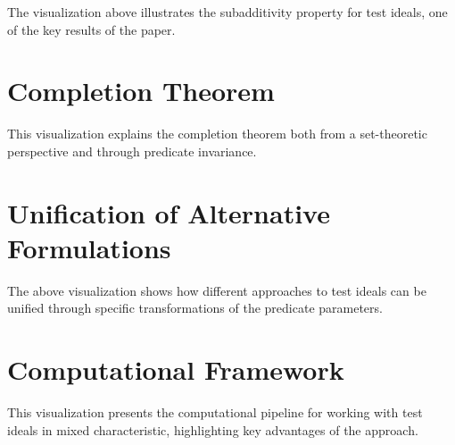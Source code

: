 \documentclass{article}
\begin{document}
The visualization above illustrates the subadditivity property for test ideals, one of the key results of the paper.

\section{Completion Theorem}


This visualization explains the completion theorem both from a set-theoretic perspective and through predicate invariance.

\section{Unification of Alternative Formulations}


The above visualization shows how different approaches to test ideals can be unified through specific transformations of the predicate parameters.

\section{Computational Framework}


This visualization presents the computational pipeline for working with test ideals in mixed characteristic, highlighting key advantages of the approach.
\end{document}
